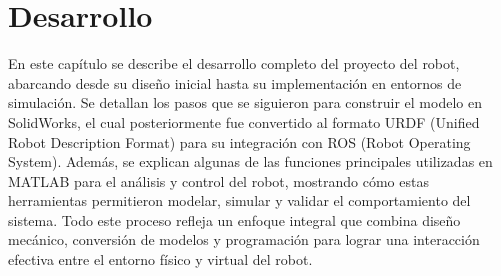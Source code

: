 \chapter{Desarrollo} \label{chap:desarrollo}
En este capítulo se describe el desarrollo completo del proyecto del robot, abarcando desde su diseño inicial hasta su implementación en entornos de simulación. Se detallan los pasos que se siguieron para construir el modelo en SolidWorks, el cual posteriormente fue convertido al formato URDF (Unified Robot Description Format) para su integración con ROS (Robot Operating System). Además, se explican algunas de las funciones principales utilizadas en MATLAB para el análisis y control del robot, mostrando cómo estas herramientas permitieron modelar, simular y validar el comportamiento del sistema. Todo este proceso refleja un enfoque integral que combina diseño mecánico, conversión de modelos y programación para lograr una interacción efectiva entre el entorno físico y virtual del robot.
